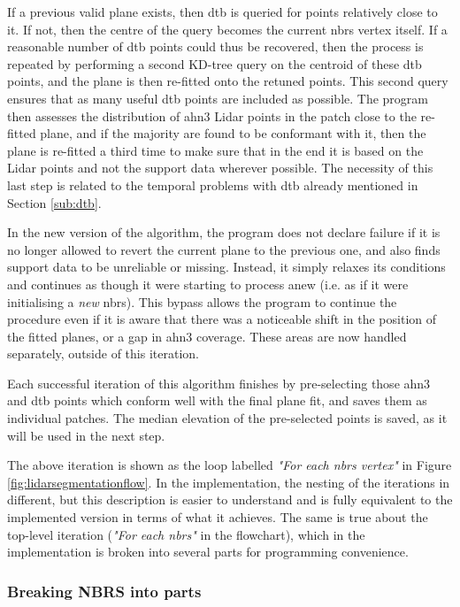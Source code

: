 If a previous valid plane exists, then \ac{dtb} is queried for points relatively close to it. If not, then the centre of the query becomes the current \ac{nbrs} vertex itself. If a reasonable number of \ac{dtb} points could thus be recovered, then the process is repeated by performing a second KD-tree query on the centroid of these \ac{dtb} points, and the plane is then re-fitted onto the retuned points. This second query ensures that as many useful \ac{dtb} points are included as possible. The program then assesses the distribution of \ac{ahn3} Lidar points in the patch close to the re-fitted plane, and if the majority are found to be conformant with it, then the plane is re-fitted a third time to make sure that in the end it is based on the Lidar points and not the support data wherever possible. The necessity of this last step is related to the temporal problems with \ac{dtb} already mentioned in Section \ref{sub:dtb}.

In the new version of the algorithm, the program does not declare failure if it is no longer allowed to revert the current plane to the previous one, and also finds support data to be unreliable or missing. Instead, it simply relaxes its conditions and continues as though it were starting to process anew (i.e. as if it were initialising a \textit{new} \ac{nbrs}). This bypass allows the program to continue the procedure even if it is aware that there was a noticeable shift in the position of the fitted planes, or a gap in \ac{ahn3} coverage. These areas are now handled separately, outside of this iteration.

Each successful iteration of this algorithm finishes by pre-selecting those \ac{ahn3} and \ac{dtb} points which conform well with the final plane fit, and saves them as individual patches. The median elevation of the pre-selected points is saved, as it will be used in the next step.

The above iteration is shown as the loop labelled \textit{"For each \ac{nbrs} vertex"} in Figure \ref{fig:lidarsegmentationflow}. In the implementation, the nesting of the iterations in different, but this description is easier to understand and is fully equivalent to the implemented version in terms of what it achieves. The same is true about the top-level iteration (\textit{"For each \ac{nbrs}"} in the flowchart), which in the implementation is broken into several parts for programming convenience.

\subsubsection{Breaking NBRS into parts}

